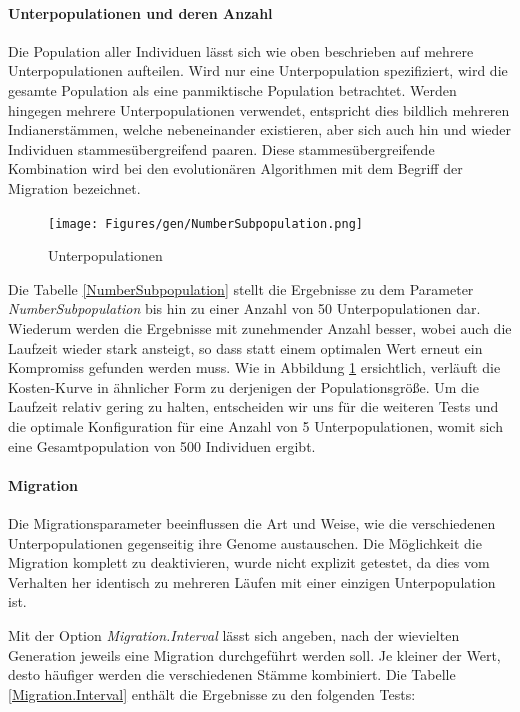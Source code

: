 \paragraph{Unterpopulationen und deren Anzahl} Die Population aller Individuen
lässt sich wie oben beschrieben auf mehrere Unterpopulationen aufteilen.
Wird nur eine Unterpopulation spezifiziert, wird die gesamte Population als
eine panmiktische Population betrachtet. Werden hingegen mehrere Unterpopulationen
verwendet, entspricht dies bildlich mehreren Indianerstämmen, welche nebeneinander
existieren, aber sich auch hin und wieder Individuen stammesübergreifend paaren.
Diese stammesübergreifende Kombination wird bei den evolutionären Algorithmen
mit dem Begriff der Migration bezeichnet.



\begin{figure}[h!]
  \centering
  \texttt{[image: Figures/gen/NumberSubpopulation.png]}
  \caption{Unterpopulationen}\label{fig.numbersubpopulation}
\end{figure}

Die Tabelle \ref{NumberSubpopulation} stellt die Ergebnisse zu dem Parameter
\emph{NumberSubpopulation} bis hin zu einer Anzahl von 50 Unterpopulationen dar.
Wiederum werden die Ergebnisse mit zunehmender Anzahl besser, wobei auch
die Laufzeit wieder stark ansteigt, so dass statt einem optimalen Wert erneut
ein Kompromiss gefunden werden muss.
Wie in Abbildung \ref{fig.numbersubpopulation} ersichtlich, verläuft die
Kosten-Kurve in ähnlicher Form zu derjenigen der Populationsgröße. Um die
Laufzeit relativ gering zu halten, entscheiden wir uns für die weiteren Tests
und die optimale Konfiguration für eine Anzahl von 5 Unterpopulationen, womit
sich eine Gesamtpopulation von 500 Individuen ergibt.


\paragraph{Migration} Die Migrationsparameter beeinflussen die Art und Weise,
wie die verschiedenen Unterpopulationen gegenseitig ihre Genome austauschen.
Die Möglichkeit die Migration komplett zu deaktivieren, wurde nicht explizit
getestet, da dies vom Verhalten her identisch zu mehreren Läufen mit einer
einzigen Unterpopulation ist.


Mit der Option \emph{Migration.Interval} lässt sich angeben, nach der wievielten
Generation jeweils eine Migration durchgeführt werden soll. Je kleiner der Wert,
desto häufiger werden die verschiedenen Stämme kombiniert. Die Tabelle
\ref{Migration.Interval} enthält die Ergebnisse zu den folgenden Tests:

